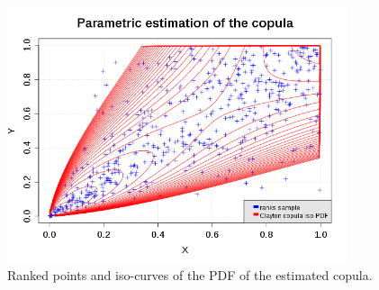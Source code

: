 \begin{figure}[H]
  \begin{center}
    \includegraphics[width=10cm]{copula_estimation.png}
  \end{center}
  \caption{Ranked points and iso-curves of the PDF of the estimated copula.}
  \label{Superposition}
\end{figure}
